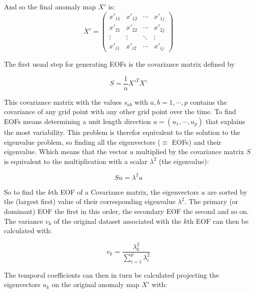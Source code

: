 And so the final anomaly map $X'$ is: 
\begin{equation}
  X' = \begin{pmatrix}
x'_{11} & x'_{12} & \cdots & x'_{1j} \\
x'_{21} & x'_{22} & \cdots & x'_{2j} \\
\vdots & \vdots & \ddots & \vdots \\
x'_{i1} & x'_{i2} & \cdots & x'_{ij}
\end{pmatrix}
  \label{eq:anomaly map}
\end{equation}

The first usual step for generating EOFs is the covariance matrix defined by 

\begin{equation}
  S = \frac{1}{n} X'^T X' 
  \label{eq:covariance map}
\end{equation}

This covariance matrix with the values $s_{ab}$ with $a,b = 1, \cdots, p$ contains the covariance of any grid point with any other grid point over the time. 
To find EOFs means determining a unit length direction $u = (u_1, \cdots, u_p)$ that explains the most variability. 
This problem is therefor equivalent to the solution to the eigenvalue problem, so finding all the eigenvectors ($\equiv$ EOFs) and their eigenvalue. Which means that the vector $u$ multiplied by the covariance matrix $S$ is equivalent to the multiplication with a scalar $\lambda^2$ (the eigenvalue):  

\begin{equation}
  Su = \lambda^2 u
  \label{eq:eigenvalue problem} 
\end{equation}

So to find the $k$th EOF of a Covariance matrix, the eigenvectors $u$ are sorted by the (largest first) value of their corresponding eigenvalue $\lambda^2$. 
The primary (or dominant) EOF the first in this order, the secondary EOF the second and so on. 
The variance $v_k$ of the original dataset associated with the $k$th EOF can then be calculated with: 

\begin{equation}
  v_k = \frac{\lambda^2_k}{\sum^{p}_{i=1} \lambda^2_i}
  \label{eq:eof variance calculation}
\end{equation}

The temporal coefficients can then in turn be calculated projecting the eigenvectors $u_k$ on the original anomaly map $X'$ with: 

